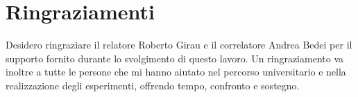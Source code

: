 \documentclass[a4paper,final,12pt,oneside]{report}
\begin{document}
\restoregeometry

\clearpage
\null
\thispagestyle{empty}
\newpage


\tableofcontents
\listoffigures
\listoftables

\cleardoublepage














\cleardoublepage
\chapter*{Ringraziamenti}

Desidero ringraziare il relatore Roberto Girau e il correlatore Andrea Bedei per il supporto fornito durante lo svolgimento di questo lavoro. Un ringraziamento va inoltre a tutte le persone che mi hanno aiutato nel percorso universitario e nella realizzazione degli esperimenti, offrendo tempo, confronto e sostegno.

\cleardoublepage


\end{document}
